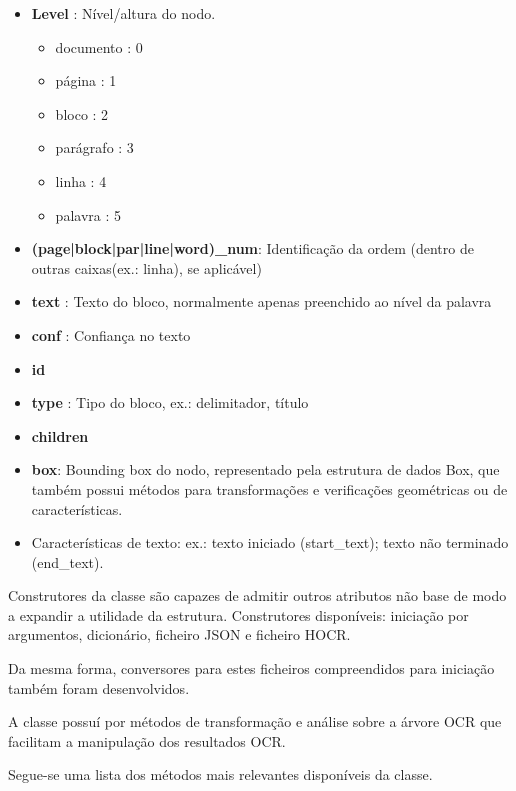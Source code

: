 \begin{itemize}\setlength\itemsep{-0.3em}
	\item \textbf{Level} : Nível/altura do nodo.
	\begin{itemize}\setlength\itemsep{-0.3em}
		\item documento : 0
		\item página 	: 1
		\item bloco		: 2
		\item parágrafo : 3
		\item linha 	: 4
		\item palavra	: 5
	\end{itemize}\setlength\itemsep{-0.3em}
	\item \textbf{(page|block|par|line|word)\_num}: Identificação da ordem (dentro de outras caixas(ex.: linha), se aplicável)
	\item \textbf{text} : Texto do bloco, normalmente apenas preenchido ao nível da palavra
	\item \textbf{conf} : Confiança no texto
	\item \textbf{id}
	\item \textbf{type} : Tipo do bloco, ex.: delimitador, título
	\item \textbf{children}
	\item \textbf{box}: Bounding box do nodo, representado pela estrutura de dados Box, que também possui métodos para transformações e verificações geométricas ou de características.
	\item Características de texto: ex.: texto iniciado (start\_text); texto não terminado (end\_text).
\end{itemize}


Construtores da classe são capazes de admitir outros atributos não base de modo a expandir a utilidade da estrutura. Construtores disponíveis: iniciação por argumentos, dicionário, ficheiro JSON e ficheiro HOCR.

Da mesma forma, conversores para estes ficheiros compreendidos para iniciação também foram desenvolvidos.

A classe possuí por métodos de transformação e análise sobre a árvore OCR que facilitam a manipulação dos resultados OCR. 

Segue-se uma lista dos métodos mais relevantes disponíveis da classe.

 

